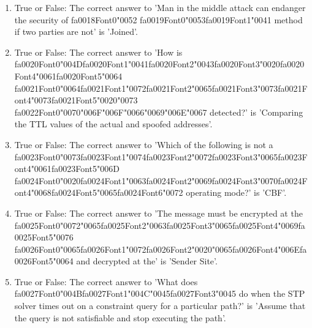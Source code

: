 \documentclass[12pt]{article}
\begin{document}
\begin{enumerate}[label=\arabic*.]
\item True or False: The correct answer to 'Man in the middle attack can endanger the security of {\csname fa0018Font0\endcsname\char"0052} {\csname fa0019Font0\endcsname\char"0053}{\csname fa0019Font1\endcsname\char"0041} method if two parties are not' is 'Joined'.
\item True or False: The correct answer to 'How is {\csname fa0020Font0\endcsname\char"004D}{\csname fa0020Font1\endcsname\char"0041}{\csname fa0020Font2\endcsname\char"0043}{\csname fa0020Font3\endcsname\char"0020}{\csname fa0020Font4\endcsname\char"0061}{\csname fa0020Font5\endcsname\char"0064} {\csname fa0021Font0\endcsname\char"0064}{\csname fa0021Font1\endcsname\char"0072}{\csname fa0021Font2\endcsname\char"0065}{\csname fa0021Font3\endcsname\char"0073}{\csname fa0021Font4\endcsname\char"0073}{\csname fa0021Font5\endcsname\char"0020}{\char"0073} {\csname fa0022Font0\endcsname\char"0070}{\char"006F}{\char"006F}{\char"0066}{\char"0069}{\char"006E}{\char"0067} detected?' is 'Comparing the TTL values of the actual and spoofed addresses'.
\item True or False: The correct answer to 'Which of the following is not a {\csname fa0023Font0\endcsname\char"0073}{\csname fa0023Font1\endcsname\char"0074}{\csname fa0023Font2\endcsname\char"0072}{\csname fa0023Font3\endcsname\char"0065}{\csname fa0023Font4\endcsname\char"0061}{\csname fa0023Font5\endcsname\char"006D} {\csname fa0024Font0\endcsname\char"0020}{\csname fa0024Font1\endcsname\char"0063}{\csname fa0024Font2\endcsname\char"0069}{\csname fa0024Font3\endcsname\char"0070}{\csname fa0024Font4\endcsname\char"0068}{\csname fa0024Font5\endcsname\char"0065}{\csname fa0024Font6\endcsname\char"0072} operating mode?' is 'CBF'.
\item True or False: The correct answer to 'The message must be encrypted at the {\csname fa0025Font0\endcsname\char"0072}{\char"0065}{\csname fa0025Font2\endcsname\char"0063}{\csname fa0025Font3\endcsname\char"0065}{\csname fa0025Font4\endcsname\char"0069}{\csname fa0025Font5\endcsname\char"0076} {\csname fa0026Font0\endcsname\char"0065}{\csname fa0026Font1\endcsname\char"0072}{\csname fa0026Font2\endcsname\char"0020}{\char"0065}{\csname fa0026Font4\endcsname\char"006E}{\csname fa0026Font5\endcsname\char"0064} and decrypted at the' is 'Sender Site'.
\item True or False: The correct answer to 'What does {\csname fa0027Font0\endcsname\char"004B}{\csname fa0027Font1\endcsname\char"004C}{\char"0045}{\csname fa0027Font3\endcsname\char"0045} do when the STP solver times out on a constraint query for a particular path?' is 'Assume that the query is not satisfiable and stop executing the path'.
\end{enumerate}
\end{document}
